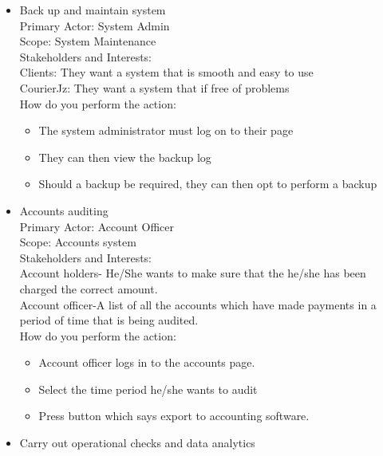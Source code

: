 \documentclass[paper=a4, fontsize=11pt]{scrartcl} %
\numberwithin{equation}{section} %
\numberwithin{figure}{section} %
\numberwithin{table}{section} %
\begin{document}
\begin{itemize}
\item Back up and maintain system\\

Primary Actor: \quad \quad System Admin \\
Scope:		\quad \quad	 System Maintenance \\
Stakeholders and Interests: \\
Clients: They want a system that is smooth and easy to use \\
CourierJz: They want a system that if free of problems \\
How do you perform the action: \\
\begin{itemize}
\item The system administrator must log on to their page
\item They can then view the backup log
\item Should a backup be required, they can then opt to perform a backup
\end{itemize}

\item Accounts auditing\\

Primary Actor: \quad \quad Account Officer \\
Scope:		\quad \quad	Accounts system  \\
Stakeholders and Interests: \\
Account holders- He/She wants to make sure that the he/she has been charged the 
                                        correct amount. \\
Account officer-A list of all the accounts which have made payments in a period of time   
                                    that is being audited. \\
How do you perform the action: \\
\begin{itemize}
\item Account officer logs in to the accounts page.
\item Select the time period he/she wants to audit
\item Press button which says export to accounting software.
\end{itemize}


\item Carry out operational checks and data analytics\\


\end{itemize}
\end{document}
